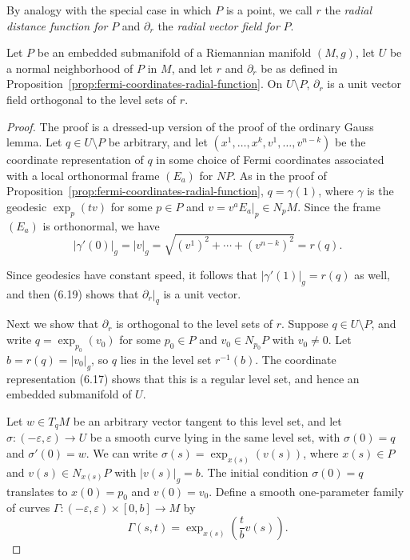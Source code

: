 By analogy with the special case in which $P$ is a point, we call $r$ the \emph{radial distance function for} $P$ and $\partial_r$ the \emph{radial vector field for} $P$.

\begin{theorem}
\label{thm:gauss-lemma-submanifolds}

Let $P$ be an embedded submanifold of a Riemannian manifold $(M,g)$, let $U$ be a normal neighborhood of $P$ in $M$, and let $r$ and $\partial_r$ be as defined in Proposition~\ref{prop:fermi-coordinates-radial-function}. On $U \setminus P$, $\partial_r$ is a unit vector field orthogonal to the level sets of $r$.
\end{theorem}

\begin{proof}
The proof is a dressed-up version of the proof of the ordinary Gauss lemma. Let $q \in U \setminus P$ be arbitrary, and let $(x^1,\ldots,x^k, v^1,\ldots,v^{n-k})$ be the coordinate representation of $q$ in some choice of Fermi coordinates associated with a local orthonormal frame $(E_a)$ for $NP$. As in the proof of Proposition~\ref{prop:fermi-coordinates-radial-function}, $q = \gamma(1)$, where $\gamma$ is the geodesic $\exp_p(tv)$ for some $p \in P$ and $v = v^a E_a|_p \in N_p M$. Since the frame $(E_a)$ is orthonormal, we have
\[
|\gamma'(0)|_g = |v|_g = \sqrt{(v^1)^2 + \cdots + (v^{n-k})^2} = r(q).
\]

Since geodesics have constant speed, it follows that $|\gamma'(1)|_g = r(q)$ as well, and then (6.19) shows that $\partial_r|_q$ is a unit vector.

Next we show that $\partial_r$ is orthogonal to the level sets of $r$. Suppose $q \in U \setminus P$, and write $q = \exp_{p_0}(v_0)$ for some $p_0 \in P$ and $v_0 \in N_{p_0} P$ with $v_0 \neq 0$. Let $b = r(q) = |v_0|_g$, so $q$ lies in the level set $r^{-1}(b)$. The coordinate representation (6.17) shows that this is a regular level set, and hence an embedded submanifold of $U$.

Let $w \in T_q M$ be an arbitrary vector tangent to this level set, and let $\sigma : (-\varepsilon, \varepsilon) \to U$ be a smooth curve lying in the same level set, with $\sigma(0) = q$ and $\sigma'(0) = w$. We can write $\sigma(s) = \exp_{x(s)}(v(s))$, where $x(s) \in P$ and $v(s) \in N_{x(s)} P$ with $|v(s)|_g = b$. The initial condition $\sigma(0) = q$ translates to $x(0) = p_0$ and $v(0) = v_0$. Define a smooth one-parameter family of curves $\Gamma : (-\varepsilon, \varepsilon) \times [0, b] \to M$ by
\[
\Gamma(s, t) = \exp_{x(s)}\left(\frac{t}{b}v(s)\right).
\]


\end{proof}
